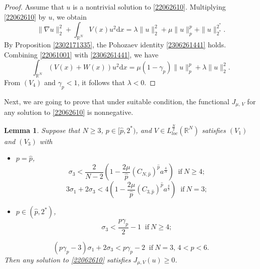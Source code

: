 \documentclass[10pt]{article}
\numberwithin{equation}{section}
\newtheorem{lemma}[theorem]{Lemma}
\newcommand{\ud}{\mathrm{d}}
\numberwithin{equation}{section}
\begin{document}
\begin{proof}
Assume that $u$ is a nontrivial solution to \eqref{22062610}. Multiplying \eqref{22062610} by $u$, we obtain
\begin{equation}\label{22061001}
\|\nabla u\|_2^2+\int_{\mathbb{R}^N} V(x)u^2 \ud x=\lambda\|u\|_2^2+\mu \|u\|_p^p+\|u\|_{2^*}^{2^*}.
\end{equation}
By Proposition \ref{2302171335}, the Pohozaev identity \eqref{2306261441} holds. Combining \eqref{22061001} with \eqref{2306261441}, we have
\begin{equation}
\int_{\mathbb{R}^N} (V(x)+W(x))u^2 \ud x=\mu (1-\gamma_p) \|u\|_p^p+\lambda\|u\|^2_2.
\end{equation}
From $(V_4)$ and $\gamma_p<1$, it follows that $\lambda<0$.
\end{proof}
Next, we are going to prove that under suitable condition, the functional $J_{\mu,\, V}$ for any solution to \eqref{22062610} is nonnegative.
\begin{lemma}\label{22072415}
Suppose that $N\ge 3$, $p\in [\hat{p}, 2^*)$, and $V\in L_{loc}^{\frac{N}{2}}(\mathbb{R}^N)$ satisfies $(V_1)$ and $(V_3)$ with
\begin{itemize}
\item[$(i)$]  $p=\hat{p}$,
\begin{equation}\label{22072321132}
{\sigma_3} <  \frac2{N-2}\left(1-\frac{2\mu}{\hat{p}}(C_{N, \hat{p}})^{\hat{p}}a^{\frac4N}\right)\;\; \text{if}~N\ge 4;
\end{equation}
\begin{equation}\label{22072321133}
 3\sigma_1 + 2\sigma_3 < 4\left(1-\frac{2\mu}{\hat{p}}(C_{3,\hat{p}})^{\hat{p}} a^{\frac43}\right)\;\; \text{if}~N=3;
\end{equation}
\item[$(ii)$]  $p\in (\hat{p}, 2^*)$,
\begin{equation}\label{2207232113}
{\sigma_3}< \frac{p\gamma_p}{2}-1\;\; \text{if}~N\ge 4;
\end{equation}
\end{itemize}
\begin{equation}\label{22072321131}
(p\gamma_p-3) \sigma_1 + 2 \sigma_3 < p\gamma_p - 2\;\; \text{if}~N=3,\, 4<p<6.
\end{equation}
Then any solution to \eqref{22062610} satisfies $J_{\mu, V}(u)\ge 0$.
\end{lemma}
\end{document}
